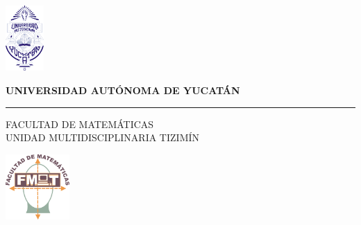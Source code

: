 \documentclass[12pt]{article}
\begin{document}
	\thispagestyle{empty}
	\hskip-2.15cm
	\begin{minipage}[c][1\totalheight][s]{3.5cm} 
		\begin{center}
			\includegraphics[height=2.5cm]{img/uady.png}\\[10pt]
		\end{center}
	\end{minipage}\begin{minipage}[c][1\totalheight][s]{12cm} 
		\begin{center}
			{\selectfont\Large\textbf {UNIVERSIDAD AUTÓNOMA DE YUCATÁN}}
			\vspace{0.3cm}
			\hrule height1.5pt
			\vspace{.3cm}
			{{\selectfont FACULTAD DE MATEMÁTICAS\\UNIDAD MULTIDISCIPLINARIA TIZIMÍN}}
		\end{center}
	\end{minipage}\begin{minipage}[c][1\totalheight][s]{3cm} 
		\begin{center}
			\includegraphics[height=2.5cm]{img/matem.png}\\[10pt]
		\end{center}
	\end{minipage}\quad
	\vspace{.01cm}
	
\end{document}
